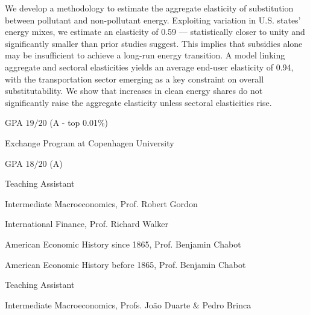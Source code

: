 \documentclass{practical-resume}
\begin{document}
	\begin{cvabstract}
	We develop a methodology to estimate the aggregate elasticity of substitution between pollutant and non-pollutant energy. Exploiting variation in U.S. states' energy mixes, we estimate an elasticity of 0.59 --- statistically closer to unity and significantly smaller than prior studies suggest. This implies that subsidies alone may be insufficient to achieve a long-run energy transition. A model linking aggregate and sectoral elasticities yields an average end-user elasticity of 0.94, with the transportation sector emerging as a key constraint on overall substitutability. We show that increases in clean energy shares do not significantly raise the aggregate elasticity unless sectoral elasticities rise.
	\end{cvabstract}
	

	\begin{position}{}{}
		\item GPA $19/20$ (A - top 0.01\%)
		\item Exchange Program at Copenhagen University
	\end{position}

	\begin{position}{}{}
		\item GPA $18/20$ (A)
	\end{position}


	\begin{position}{Teaching Assistant}{}
		\item Intermediate Macroeconomics, Prof. Robert Gordon
		\item International Finance, Prof. Richard Walker
		\item American Economic History since 1865, Prof. Benjamin Chabot
		\item American Economic History before 1865, Prof. Benjamin Chabot
	\end{position}
	
	\begin{position}{Teaching Assistant}{}
		\item Intermediate Macroeconomics, Profs. João Duarte \& Pedro Brinca
	\end{position}
\end{document}
